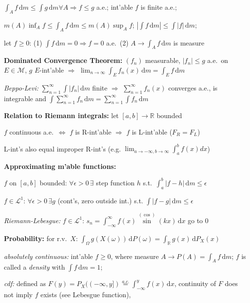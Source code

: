 \documentclass[8pt,twoside]{extarticle}
\begin{document}
\begin{multicols}{2}
$\int_A f \, \mathrm{d}m \leq \int g \, \mathrm{d}m \forall A \Rightarrow f\leq g$ a.e.; int'able $f$ is finite a.e.; 

$m(A)\inf_A f \leq \int_A f \, \mathrm{d}m \leq m(A) \sup_A f$; $|\int f \, \mathrm{d}m| \leq \int |f| \, \mathrm{d}m$;

let $f\geq 0$: (1) $\int f \, \mathrm{d}m{=}0 \Rightarrow f{=}0$ a.e.\ (2) $A\to \int_A f \, \mathrm{d}m$ is  measure

\textbf{Dominated Convergence Theorem:} $(f_n)$ measurable, $|f_n|{\leq} g$ a.e.\ on $E{\in} \mathcal{M}$, $g$ $E$-int'able $\Rightarrow$  $\displaystyle\lim_{n\to\infty} \int_E f_n(x)\,\mathrm{d}m = \int_E f \,\mathrm{d}m$

\textit{Beppo-Levi:} $\sum_{n=1}^\infty \int |f_n| \,\mathrm{d}m$ finite $\Rightarrow$ $\sum_{n=1}^\infty f_n(x)$ converges a.e., is integrable and
$\int\sum_{n=1}^\infty f_n \,\mathrm{d}m = \sum_{n=1}^\infty \int f_n \,\mathrm{d}m$

\textbf{Relation to Riemann integrals:} let $[a,b] \to \mathbb{R}$ bounded

$f$ continuous a.e.\ $\Leftrightarrow$  $f$ is R-int'able $\Rightarrow$ $f$ is L-int'able ($F_R=F_L$)

L-int's also equal improper R-int's (e.g. $\displaystyle\lim_{a\to -\infty, b\to \infty} \int_a^b f(x)dx$)

\textbf{Approximating m'able functions:}

 $f$ on $[a,b]$ bounded: $\forall \epsilon>0\, \exists$ step function $h$ s.t.\ $\int_a^b|f{-}h|\,\mathrm{d}m\leq \epsilon$
 
 $f{\in} \mathcal{L}^1$: $\forall \epsilon{>}0 \, \exists g$ (cont's, zero outside int.) s.t. $\int|f{-}g|\,\mathrm{d}m\leq \epsilon$
 
 \textit{Riemann-Lebesgue:} $f{\in}\mathcal{L}^1$: $s_n {=} \int_{{-}\infty}^\infty f(x)\overset{(\cos)}{\sin} (kx)  \,\mathrm{d}x$ go to 0

\textbf{Probability:} for r.v.\ $X$: $\int_\Omega g(X(\omega))\,\mathrm{d}P(\omega) = \int_\mathbb{R} g(x)\,\mathrm{d}P_X(x)$

\textit{absolutely continuous:} int'able $f\geq 0$, where measure $A\to P(A)=\int_A f \,\mathrm{d}m$; $f$ is called a \textit{density} with $\int f \,\mathrm{d} m = 1$; 

\textit{cdf:} defined as $F(y)= P_X((-\infty, y])\overset{a.c.}{=}\int_{-\infty}^y f(x) \,\mathrm{d}x$,
 continuity of $F$ does not imply $f$ exists (see Lebesgue function), 


\end{multicols}
\end{document}
